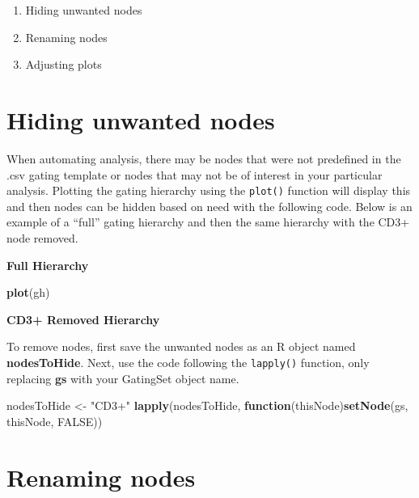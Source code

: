 \documentclass[]{book}
\newenvironment{Shaded}{\begin{snugshade}}{\end{snugshade}}
\newcommand{\ControlFlowTok}[1]{\textcolor[rgb]{0.13,0.29,0.53}{\textbf{#1}}}
\newcommand{\KeywordTok}[1]{\textcolor[rgb]{0.13,0.29,0.53}{\textbf{#1}}}
\newcommand{\NormalTok}[1]{#1}
\newcommand{\OtherTok}[1]{\textcolor[rgb]{0.56,0.35,0.01}{#1}}
\newcommand{\StringTok}[1]{\textcolor[rgb]{0.31,0.60,0.02}{#1}}
\providecommand{\tightlist}{%
  \setlength{\itemsep}{0pt}\setlength{\parskip}{0pt}}
\begin{document}
\begin{enumerate}
\def\labelenumi{\arabic{enumi}.}
\tightlist
\item
  Hiding unwanted nodes
\item
  Renaming nodes
\item
  Adjusting plots
\end{enumerate}

\hypertarget{hiding-unwanted-nodes}{%
\section{Hiding unwanted nodes}\label{hiding-unwanted-nodes}}

When automating analysis, there may be nodes that were not predefined in the .csv gating template or nodes that may not be of interest in your particular analysis. Plotting the gating hierarchy using the \texttt{plot()} function will display this and then nodes can be hidden based on need with the following code. Below is an example of a ``full'' gating hierarchy and then the same hierarchy with the CD3+ node removed.

\textbf{Full Hierarchy}

\begin{Shaded}
\begin{Highlighting}[]
\KeywordTok{plot}\NormalTok{(gh)}
\end{Highlighting}
\end{Shaded}

\textbf{CD3+ Removed Hierarchy}

To remove nodes, first save the unwanted nodes as an R object named \textbf{nodesToHide}. Next, use the code following the \texttt{lapply()} function, only replacing \textbf{gs} with your GatingSet object name.

\begin{Shaded}
\begin{Highlighting}[]
\NormalTok{nodesToHide <-}\StringTok{ "CD3+"}
\KeywordTok{lapply}\NormalTok{(nodesToHide, }\ControlFlowTok{function}\NormalTok{(thisNode)}\KeywordTok{setNode}\NormalTok{(gs, thisNode, }\OtherTok{FALSE}\NormalTok{))}
\end{Highlighting}
\end{Shaded}

\hypertarget{renaming-nodes}{%
\section{Renaming nodes}\label{renaming-nodes}}
\end{document}
